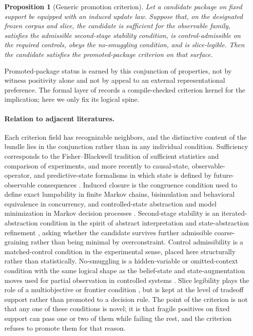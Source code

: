 \documentclass[11pt]{article}
\newtheorem{proposition}[theorem]{Proposition}
\theoremstyle{definition}
\begin{document}
\begin{proposition}[Generic promotion criterion]\label{prop:generic-promotion-criterion}
Let a candidate package on fixed support be equipped with an induced update law. Suppose that, on the designated frozen corpus and slice, the candidate is sufficient for the observable family, satisfies the admissible second-stage stability condition, is control-admissible on the required controls, obeys the no-smuggling condition, and is slice-legible. Then the candidate satisfies the promoted-package criterion on that surface.
\end{proposition}

Promoted-package status is earned by this conjunction of properties, not by witness positivity alone and not by appeal to an external representational preference. The formal layer of  records a compile-checked criterion kernel for the implication; here we only fix its logical spine.

\paragraph{Relation to adjacent literatures.}
Each criterion field has recognizable neighbors, and the distinctive content of the bundle lies in the conjunction rather than in any individual condition. Sufficiency corresponds to the Fisher--Blackwell tradition of sufficient statistics and comparison of experiments, and more recently to causal-state, observable-operator, and predictive-state formalisms in which state is defined by future-observable consequences \citep{Fisher1922,Blackwell1953,CrutchfieldYoung1989,ShaliziCrutchfield2001,Jaeger2000,LittmanSuttonSingh2001}. Induced closure is the congruence condition used to define exact lumpability in finite Markov chains, bisimulation and behavioral equivalence in concurrency, and controlled-state abstraction and model minimization in Markov decision processes \citep{Nerode1958,Park1981,KemenySnell1960,RogersPitman1981,Buchholz1994,DeanGivan1997,GivanDeanGreig2003}. Second-stage stability is an iterated-abstraction condition in the spirit of abstract interpretation and state-abstraction refinement \citep{CousotCousot1977,LiWalshLittman2006}, asking whether the candidate survives further admissible coarse-graining rather than being minimal by overconstraint. Control admissibility is a matched-control condition in the experimental sense, placed here structurally rather than statistically. No-smuggling is a hidden-variable or omitted-context condition with the same logical shape as the belief-state and state-augmentation moves used for partial observation in controlled systems \citep{KaelblingLittmanCassandra1998,LittmanSuttonSingh2001,Jaeger2000}. Slice legibility plays the role of a multiobjective or frontier condition \citep{Pareto1896,Miettinen1998,Ehrgott2005}, but is kept at the level of tradeoff support rather than promoted to a decision rule. The point of the criterion is not that any one of these conditions is novel; it is that fragile positives on fixed support can pass one or two of them while failing the rest, and the criterion refuses to promote them for that reason.
\end{document}
